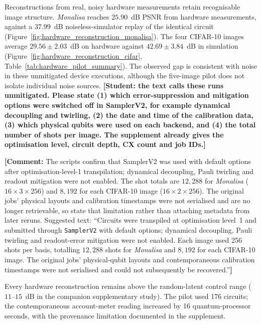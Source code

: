 \documentclass[pdflatex,sn-basic]{sn-jnl}
\newcommand{\yellowcomment}[1]{%
  \par\smallskip\noindent
  \begingroup\setlength{\fboxsep}{3pt}%
  \colorbox{yellow!35}{\parbox{\dimexpr\linewidth-2\fboxsep\relax}{\textbf{[Comment:} #1\textbf{]}}}%
  \endgroup\par\smallskip}
\begin{document}
Reconstructions from real, noisy hardware measurements retain recognisable image
structure. \textit{Monalisa} reaches $25.90$~dB PSNR from hardware measurements,
against a $37.99$~dB noiseless-simulator replay of the identical circuit
(Figure~\ref{fig:hardware_reconstruction_monalisa}). The four CIFAR-10 images
average $29.56\pm2.03$~dB on hardware against $42.69\pm3.84$~dB in simulation
(Figure~\ref{fig:hardware_reconstruction_cifar},
Table~\ref{tab:hardware_pilot_summary}). The observed gap is consistent with
noise in these unmitigated device executions, although the five-image pilot does
not isolate individual noise sources.
{\color{red}\textbf{[Student: the text calls these runs unmitigated. Please
state (1) which error-suppression and mitigation options were switched off in
SamplerV2, for example dynamical decoupling and twirling, (2) the date and time
of the calibration data, (3) which physical qubits were used on each backend,
and (4) the total number of shots per image. The supplement already gives the
optimisation level, circuit depth, CX count and job IDs.]}}
\yellowcomment{The scripts confirm that SamplerV2 was used with default options after optimisation-level-1 transpilation; dynamical decoupling, Pauli twirling and readout mitigation were not enabled. The shot totals are $12{,}288$ for \textit{Monalisa} ($16\times3\times256$) and $8{,}192$ for each CIFAR-10 image ($16\times2\times256$). The original jobs' physical layouts and calibration timestamps were not serialised and are no longer retrievable, so state that limitation rather than attaching metadata from later reruns. Suggested text: ``Circuits were transpiled at optimisation level~1 and submitted through \texttt{SamplerV2} with default options; dynamical decoupling, Pauli twirling and readout-error mitigation were not enabled. Each image used 256 shots per basis, totalling $12{,}288$ shots for \textit{Monalisa} and $8{,}192$ for each CIFAR-10 image. The original jobs' physical-qubit layouts and contemporaneous calibration timestamps were not serialised and could not subsequently be recovered.''}
 Every hardware reconstruction remains above
the random-latent control range ($11$--$15$~dB in the companion supplementary
study). The pilot used 176 circuits; the contemporaneous account-meter reading
increased by 16 quantum-processor seconds, with the provenance limitation
documented in the supplement.
\end{document}
